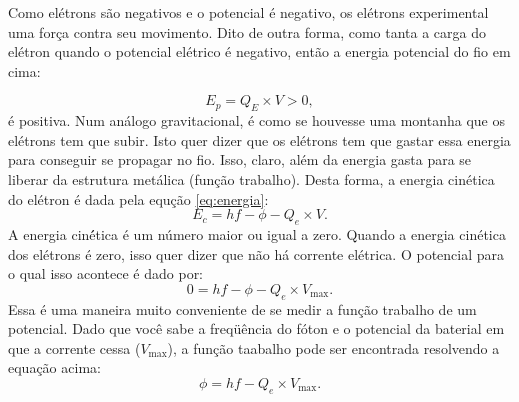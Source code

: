 \documentclass{article}
\begin{document}
Como el\'etrons s\~ao negativos e o potencial \'e negativo, os el\'etrons experimental uma for\c ca contra seu movimento. Dito de outra forma, como tanta a carga do el\'etron quando o potencial el\'etrico \'e negativo, ent\~ao a energia potencial do fio em cima:

\begin{equation}
E_p = Q_E\times V > 0,
\end{equation}
\'e positiva. Num an\'alogo gravitacional, \'e como se houvesse uma montanha que os el\'etrons tem que subir. Isto quer dizer que os el\'etrons tem que gastar essa energia para conseguir se propagar no fio. Isso, claro, al\'em da energia gasta para se liberar da estrutura met\'alica (fun\c c\~ao trabalho). Desta forma, a energia cin\'etica do el\'etron \'e dada pela equ\c c\~ao \eqref{eq:energia}:
\begin{equation}
E_c = hf - \phi - Q_e\times V.
\end{equation}
A energia cin\'ética \'e um n\'umero maior ou igual a zero. Quando a energia cin\'etica dos el\'etrons \'e zero, isso quer dizer que n\~ao h\'a corrente el\'etrica. O potencial para o qual isso acontece \'e dado por:
\begin{equation}
0 = hf - \phi - Q_e\times V_{\text{max}}.
\end{equation}
Essa \'e uma maneira muito conveniente de se medir a fun\c c\~ao trabalho de um potencial. Dado que voc\^e sabe a freq\"u\^encia do f\'oton e o potencial da baterial em que a corrente cessa ($V_{\text{max}}$), a fun\c c\~ao taabalho pode ser encontrada resolvendo a equa\c c\~ao acima:
\begin{equation}
\phi = hf - Q_e\times V_{\text{max}}.
\end{equation}
\end{document}
